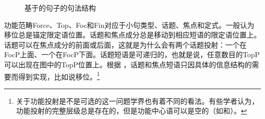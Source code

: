 \begin{figure}
\centering
{}
\caption{\label{Abbildung-Rizzi}基于\citet[]{Rizzi97a-u}的句子的句法结构}
\end{figure}%
功能范畴Force、Top、Foc和Fin对应于小句类型、话题、焦点和定式。一般认为移位总是锚定限定语位置。话题和焦点成分总是移动到相应短语的限定语位置上。话题可以在焦点成分的前面或后面，这就是为什么会有两个话题投射：一个在FocP上面、一个在FocP下面。话题短语是可递归的，也就是说，任意数目的TopP可以出现在图中的TopP位置上。根据 \citet[]{Grewendorf2002a}，话题和焦点短语只因具体的信息结构的需要而得到实现，比如说移位。\footnote{%
关于功能投射是不是可选的这一问题学界也有着不同的看法。有些学者认为，功能投射的完整层级总是存在的，但是功能中心语可以是空的（如\citealp[]{Cinque99a-u}和\citealp[]{CR2010a}）。
}  

